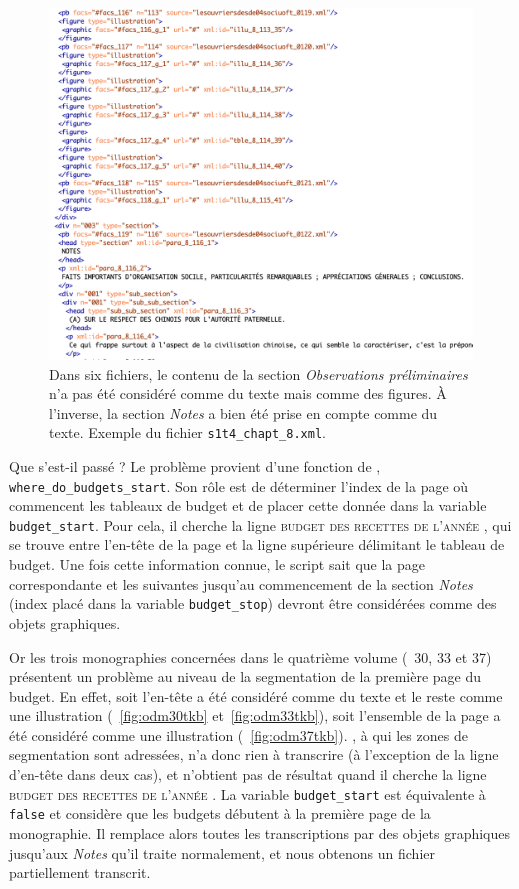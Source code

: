 \begin{figure}[ht]
    \centering
    \includegraphics[width=15cm]{img/deficit_transcrip.png}
    \caption[Exemple d'un déficit de transcription]{Dans six fichiers, le contenu de la section \textit{Observations préliminaires} n'a pas été considéré comme du texte mais comme des figures. À l'inverse, la section \textit{Notes} a bien été prise en compte comme du texte. Exemple du fichier \texttt{s1t4\_chapt\_8.xml}.}
    \label{fig:deficit}
\end{figure}

Que s'est-il passé ? Le problème provient d'une fonction de \lse, \texttt{where\_do\_\-budgets\_start}. Son  rôle est de déterminer l'index de la page où commencent les tableaux de budget et de placer cette donnée dans la variable \texttt{budget\_start}. Pour cela, il cherche la ligne \og \textsc{budget des recettes de l'année} \fg, qui se trouve entre l'en-tête de la page et la ligne supérieure délimitant le tableau de budget. Une fois cette information connue, le script sait que la page correspondante et les suivantes jusqu'au commencement de la section \textit{Notes} (index placé dans la variable \texttt{budget\_stop}) devront être considérées comme des objets graphiques.

Or les trois monographies concernées dans le quatrième volume (\no{}~30, 33 et 37) présentent un problème au niveau de la segmentation de la première page du budget. En effet, soit l'en-tête a été considéré comme du texte et le reste comme une illustration (\fig{}~\ref{fig:odm30tkb} et~\ref{fig:odm33tkb}), soit l'ensemble de la page a été considéré comme une illustration (\fig{}~\ref{fig:odm37tkb}). \kraken, à qui les zones de segmentation sont adressées, n'a donc rien à transcrire (à l'exception de la ligne d'en-tête dans deux cas), et \lse{} n'obtient pas de résultat quand il cherche la ligne \og \textsc{budget des recettes de l'année} \fg{}. La variable \texttt{budget\_start} est équivalente à \texttt{false} et \lse{} considère que les budgets débutent à la première page de la monographie. Il remplace alors toutes les transcriptions par des objets graphiques jusqu'aux \textit{Notes} qu'il traite normalement, et nous obtenons un fichier partiellement transcrit.

